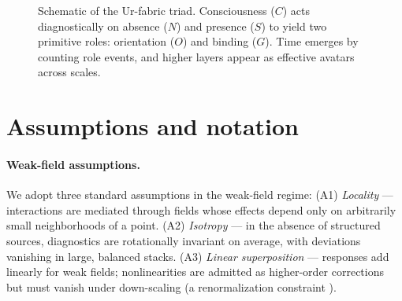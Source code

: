 \documentclass[12pt,a4paper,oneside]{scrreprt}
\def\({}%
\begin{document}
\begin{figure}[ht]
\centering
{}
\caption{Schematic of the Ur-fabric triad. Consciousness ($C$) acts diagnostically on absence ($N$) and presence ($S$) to yield two primitive roles: orientation ($O$) and binding ($G$). Time emerges by counting role events, and higher layers appear as effective avatars across scales.}
\label{fig:ur-fabric-triad}
\end{figure}

\section{Assumptions and notation}\label{sec:ur-assumptions}

\paragraph{Weak-field assumptions.} 
We adopt three standard assumptions in the weak-field regime:  
(A1) \emph{Locality} --- interactions are mediated through fields whose effects depend only on arbitrarily small neighborhoods of a point.  
(A2) \emph{Isotropy} --- in the absence of structured sources, diagnostics are rotationally invariant on average, with deviations vanishing in large, balanced stacks.  
(A3) \emph{Linear superposition} --- responses add linearly for weak fields; nonlinearities are admitted as higher-order corrections but must vanish under down-scaling (a renormalization constraint \citep{Wilson1971RG,Kadanoff1966}).  
\end{document}

